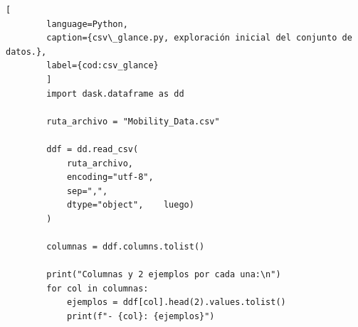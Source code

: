     \begin{lstlisting}[
        language=Python,
        caption={csv\_glance.py, exploración inicial del conjunto de datos.},
        label={cod:csv_glance}
        ]
        import dask.dataframe as dd

        ruta_archivo = "Mobility_Data.csv"  

        ddf = dd.read_csv(
            ruta_archivo,
            encoding="utf-8",  
            sep=",",          
            dtype="object",    luego)
        )

        columnas = ddf.columns.tolist()

        print("Columnas y 2 ejemplos por cada una:\n")
        for col in columnas:
            ejemplos = ddf[col].head(2).values.tolist() 
            print(f"- {col}: {ejemplos}")
    \end{lstlisting}

